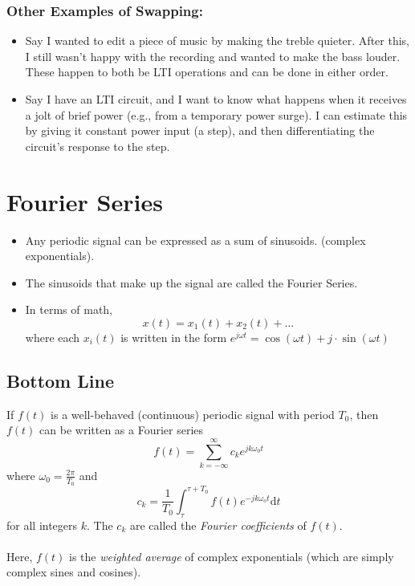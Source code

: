 \documentclass[10pt]{article}
\begin{document}
\subsubsection*{Other Examples of Swapping:}
\begin{itemize}
    \item Say I wanted to edit a piece of music by making the treble quieter.  After this, I still wasn't happy with the recording and wanted to make the bass louder.  These happen to both be LTI operations and can be done in either order.
    \item Say I have an LTI circuit, and I want to know what happens when it receives a jolt of brief power (e.g., from a temporary power surge).  I can estimate this by giving it constant power input (a step), and then differentiating the circuit's response to the step.
\end{itemize}

\section*{Fourier Series}
\begin{itemize}
    \item Any periodic signal can be expressed as a sum of sinusoids. (complex exponentials).
    \item The sinusoids that make up the signal are called the Fourier Series.
    \item In terms of math,
    \[x(t) = x_1(t) + x_2(t) + \dots\]
    where each $x_i(t)$ is written in the form $e^{j\omega t} = \cos(\omega t) + j \cdot \sin(\omega t)$
\end{itemize}

\subsection*{Bottom Line}
If $f(t)$ is a well-behaved (continuous) periodic signal with period $T_0$, then $f(t)$ can be written as a Fourier series
\[\boxed{f(t) = \sum_{k = -\infty}^\infty c_k e^{jk\omega_0 t}}\]
where $\omega_0 = \frac{2\pi}{T_0}$ and
\[\boxed{c_k = \frac{1}{T_0} \int_\tau^{\tau + T_0} f(t) e^{-jk\omega_o t}\text{d}t}\]
for all integers $k$.  The $c_k$ are called the \textit{Fourier coefficients} of $f(t)$.\\\\
Here, $f(t)$ is the \textit{weighted average} of complex exponentials (which are simply complex sines and cosines).
\end{document}

